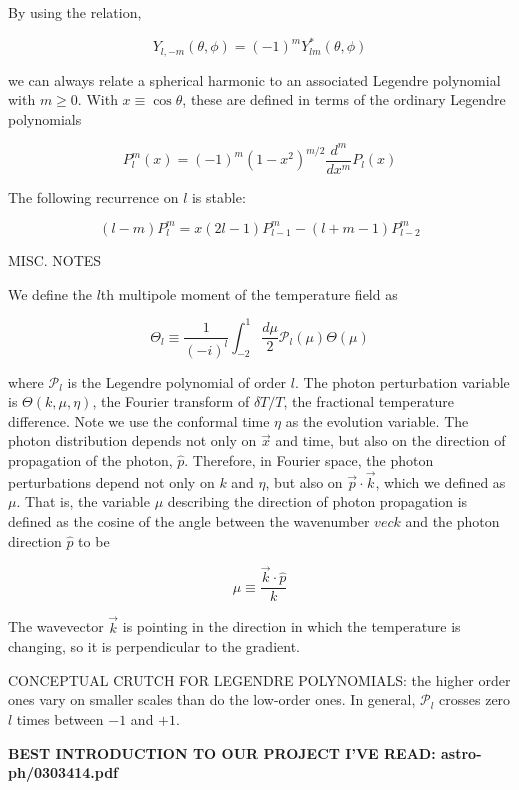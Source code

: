 \documentclass[a4paper, 11pt]{article}
\begin{document}
By using the relation, 

$$
Y_{l,-m}(\theta, \phi) = (-1)^m Y_{lm}^{*}(\theta, \phi)
$$

we can always relate a spherical harmonic to an associated Legendre polynomial with $m\geq0$. With $x\equiv\cos\theta$, these are defined in terms of the ordinary Legendre polynomials 

$$
P^m_l(x)=(-1)^m(1-x^2)^{m/2}\frac{d^m}{d x^m}P_l(x)
$$

The following recurrence on $l$ is stable:

$$
(l-m)P^m_l = x(2l-1)P^m_{l-1}-(l+m-1)P^m_{l-2}
$$



MISC. NOTES %

We define the $l$th multipole moment of the temperature field as 

$$
\Theta_l\equiv \frac{1}{(-i)^l}\int^{1}_{-2}\frac{d\mu}{2}\mathcal{P}_l(\mu)\Theta(\mu)
$$

where $\mathcal{P}_l$ is the Legendre polynomial of order $l$. The photon perturbation variable is $\Theta(k,\mu,\eta)$, the Fourier transform of $\delta T/T$, the fractional temperature difference. Note we use the conformal time $\eta$ as the evolution variable. The photon distribution depends not only on $\vec{x}$ and time, but also on the direction of propagation of the photon, $\hat{p}$. Therefore, in Fourier space, the photon perturbations depend not only on $k$ and $\eta$, but also on $\vec{p}\cdot\vec{k}$, which we defined as $\mu$. That is, the variable $\mu$ describing the direction of photon propagation is defined as the cosine of the angle between the wavenumber $vec{k}$ and the photon direction $\hat{p}$ to be 

$$
\mu\equiv \frac{\vec{k}\cdot\hat{p}}{k}
$$

The wavevector $\vec{k}$ is pointing in the direction in which the temperature is changing, so it is perpendicular to the gradient. 

CONCEPTUAL CRUTCH FOR LEGENDRE POLYNOMIALS: the higher order ones vary on smaller scales than do the low-order ones. In general, $\mathcal{P}_l$ crosses zero $l$ times between $-1$ and $+1$. 

\textbf{BEST INTRODUCTION TO OUR PROJECT I'VE READ: astro-ph/0303414.pdf}
\end{document}
